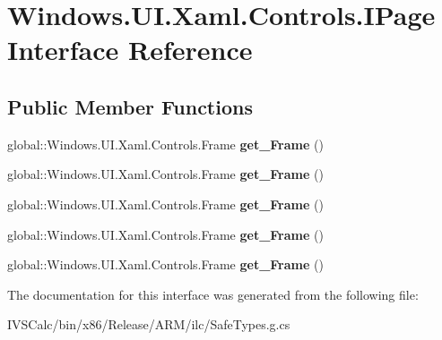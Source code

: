 \hypertarget{interface_windows_1_1_u_i_1_1_xaml_1_1_controls_1_1_i_page}{}\section{Windows.\+U\+I.\+Xaml.\+Controls.\+I\+Page Interface Reference}
\label{interface_windows_1_1_u_i_1_1_xaml_1_1_controls_1_1_i_page}
\subsection*{Public Member Functions}
\begin{DoxyCompactItemize}
\item 
\mbox{\label{interface_windows_1_1_u_i_1_1_xaml_1_1_controls_1_1_i_page_aef54170dd515329a36d7c6f7de392ec3}} 
global\+::\+Windows.\+U\+I.\+Xaml.\+Controls.\+Frame {\bfseries get\+\_\+\+Frame} ()
\item 
\mbox{\label{interface_windows_1_1_u_i_1_1_xaml_1_1_controls_1_1_i_page_aef54170dd515329a36d7c6f7de392ec3}} 
global\+::\+Windows.\+U\+I.\+Xaml.\+Controls.\+Frame {\bfseries get\+\_\+\+Frame} ()
\item 
\mbox{\label{interface_windows_1_1_u_i_1_1_xaml_1_1_controls_1_1_i_page_aef54170dd515329a36d7c6f7de392ec3}} 
global\+::\+Windows.\+U\+I.\+Xaml.\+Controls.\+Frame {\bfseries get\+\_\+\+Frame} ()
\item 
\mbox{\label{interface_windows_1_1_u_i_1_1_xaml_1_1_controls_1_1_i_page_aef54170dd515329a36d7c6f7de392ec3}} 
global\+::\+Windows.\+U\+I.\+Xaml.\+Controls.\+Frame {\bfseries get\+\_\+\+Frame} ()
\item 
\mbox{\label{interface_windows_1_1_u_i_1_1_xaml_1_1_controls_1_1_i_page_aef54170dd515329a36d7c6f7de392ec3}} 
global\+::\+Windows.\+U\+I.\+Xaml.\+Controls.\+Frame {\bfseries get\+\_\+\+Frame} ()
\end{DoxyCompactItemize}


The documentation for this interface was generated from the following file\+:\begin{DoxyCompactItemize}
\item 
I\+V\+S\+Calc/bin/x86/\+Release/\+A\+R\+M/ilc/Safe\+Types.\+g.\+cs\end{DoxyCompactItemize}
